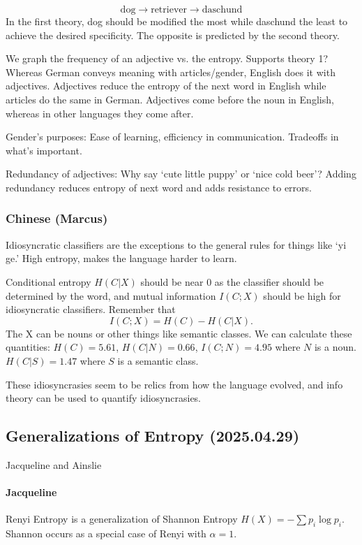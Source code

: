 \documentclass[12pt]{article}
\theoremstyle{remark}
\begin{document}
\[\text{dog} \to \text{retriever} \to \text{daschund}\] In the first theory, dog should be modified the most while daschund the least to achieve the desired specificity. The opposite is predicted by the second theory. 

We graph the frequency of an adjective vs. the entropy. Supports theory 1? Whereas German conveys meaning with articles/gender, English does it with adjectives. Adjectives reduce the entropy of the next word in English while articles do the same in German. Adjectives come before the noun in English, whereas in other languages they come after.

Gender's purposes: Ease of learning, efficiency in communication. Tradeoffs in what's important.

Redundancy of adjectives: Why say `cute little puppy' or `nice cold beer'? Adding redundancy reduces entropy of next word and adds resistance to errors.

\subsubsection{Chinese (Marcus)}
Idiosyncratic classifiers are the exceptions to the general rules for things like `yi ge.' High entropy, makes the language harder to learn.

Conditional entropy $H(C|X)$ should be near 0 as the classifier should be determined by the word, and mutual information $I(C;X)$ should be high for idiosyncratic classifiers. Remember that
\[I(C;X)=H(C) - H(C|X).\] The X can be nouns or other things like semantic classes. We can calculate these quantities:
$H(C) = 5.61$, $H(C|N)=0.66$, $I(C;N) = 4.95$ where $N$ is a noun. $H(C|S) = 1.47$ where $S$ is a semantic class.

These idiosyncrasies seem to be relics from how the language evolved, and info theory can be used to quantify idiosyncrasies. 

\subsection{Generalizations of Entropy (2025.04.29)}
Jacqueline and Ainslie

\paragraph{Jacqueline}
Renyi Entropy is a generalization of Shannon Entropy $H(X)=-\sum p_i \log p_i$. Shannon occurs as a special case of Renyi with $\alpha = 1$.
\end{document}
